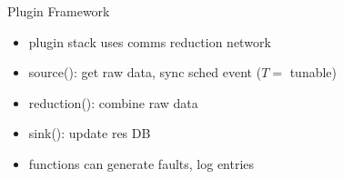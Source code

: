 \documentclass[default,pdf,colorBG,slideColor]{prosper}
\begin{document}
\begin{slide}{Plugin Framework}{\small
\begin{center}
\begin{minipage}[b]{0.4\linewidth}
\end{minipage}
\hspace{0.5cm}
\begin{minipage}[b]{0.4\linewidth}
\end{minipage}
\end{center}
\begin{itemize}
  \item{plugin stack uses comms reduction network}
  \item{source(): get raw data, sync sched event ($T=$ tunable)}
  \item{reduction(): combine raw data}
  \item{sink(): update res DB}
  \item{functions can generate faults, log entries}
\end{itemize}
}\end{slide}
\end{document}
